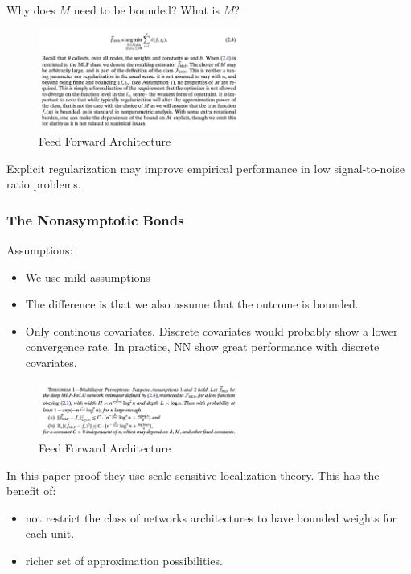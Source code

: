 \documentclass{article}
\begin{document}
Why does $M$ need to be bounded? What is $M$?

\begin{figure}[H]
  \centering
  \includegraphics[width=250px]{draft-photos/dnn-for-estimation/dnn_m_condition.png}
  \caption{Feed Forward Architecture}
  \label{fig:dnn_m_condition}
\end{figure}

Explicit regularization may improve empirical performance in low signal-to-noise ratio problems.

\subsubsection{The Nonasymptotic Bonds}
Assumptions:
\begin{itemize}
  \item We use mild assumptions
  \item The difference is that we also assume that the outcome is bounded.
  \item Only continous covariates. Discrete covariates would probably show a lower convergence rate. In practice, NN show great performance with discrete covariates.
\end{itemize}

\begin{figure}[H]
  \centering
  \includegraphics[width=250px]{draft-photos/dnn-for-estimation/dnn_theorem_1.png}
  \caption{Feed Forward Architecture}
  \label{fig:dnn_theorem_1}
\end{figure}

In this paper proof they use scale sensitive localization theory. This has the benefit of:
\begin{itemize}
  \item not restrict the class of networks architectures to have bounded weights for each unit.
  \item richer set of approximation possibilities.
\end{itemize}
\end{document}
